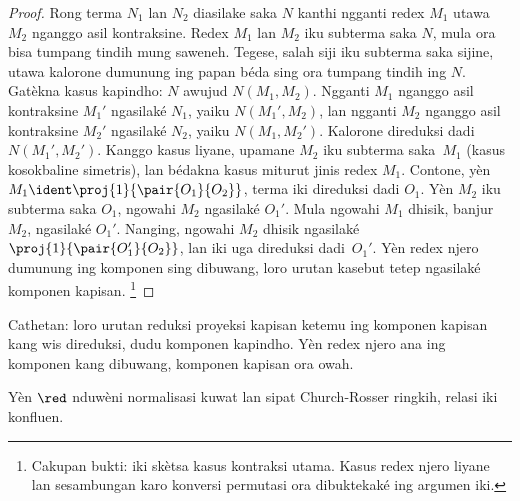 \documentclass[../../../include/open-logic-section]{subfiles}
\begin{document}
\begin{proof}
  Rong terma $N_1$ lan $N_2$ diasilake saka $N$ kanthi ngganti redex
  $M_1$ utawa $M_2$ nganggo asil kontraksine. Redex $M_1$ lan $M_2$
  iku subterma saka $N$, mula ora bisa tumpang tindih mung saweneh.
  Tegese, salah siji iku subterma saka sijine, utawa kalorone dumunung
  ing papan béda sing ora tumpang tindih ing $N$. Gatèkna kasus kapindho:
  $N$ awujud $N(M_1,M_2)$. Ngganti $M_1$ nganggo asil kontraksine $M_1'$
  ngasilaké $N_1$, yaiku $N(M_1',M_2)$, lan ngganti $M_2$ nganggo
  asil kontraksine $M_2'$ ngasilaké $N_2$, yaiku $N(M_1,M_2')$.
  Kalorone direduksi dadi $N(M_1',M_2')$. Kanggo kasus liyane,
  upamane $M_2$ iku subterma saka~$M_1$ (kasus kosokbaline simetris),
  lan bédakna kasus miturut jinis redex $M_1$. Contone, yèn $M_1 \ident
  \proj{1}{\pair{O_1}{O_2}}$, terma iki direduksi dadi $O_1$. Yèn $M_2$
  iku subterma saka $O_1$, ngowahi $M_2$ ngasilaké $O_1'$. Mula
  ngowahi $M_1$ dhisik, banjur $M_2$, ngasilaké $O_1'$. Nanging,
  ngowahi $M_2$ dhisik ngasilaké $\proj{1}{\pair{O_1'}{O_2}}$, lan
  iki uga direduksi dadi~$O_1'$. Yèn redex njero dumunung ing komponen
  sing dibuwang, loro urutan kasebut tetep ngasilaké komponen kapisan.
  \footnote{Cakupan bukti: iki skètsa kasus kontraksi utama. Kasus redex njero liyane lan sesambungan karo konversi permutasi ora dibuktekaké ing argumen iki.}
\end{proof}
Cathetan: loro urutan reduksi proyeksi kapisan ketemu ing komponen kapisan kang wis direduksi, dudu komponen kapindho. Yèn redex njero ana ing komponen kang dibuwang, komponen kapisan ora owah.

\begin{lem}
Yèn $\red$ nduwèni normalisasi kuwat lan sipat Church-Rosser ringkih,
relasi iki konfluen.
\end{lem}
\end{document}
